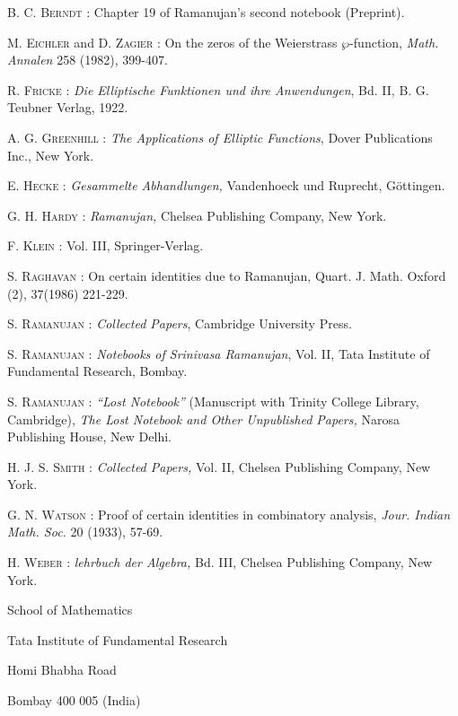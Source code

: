 \begin{thebibliography}{99}
 \textsc{B. C. Berndt :} Chapter 19 of Ramanujan's second notebook (Preprint).

 \textsc{M. Eichler} and \textsc{D. Zagier :} On the zeros of the Weierstrass $\wp$-function, {\em Math. Annalen} 258 (1982), 399-407.

 \textsc{R. Fricke :} {\em Die Elliptische Funktionen und ihre Anwendungen}, Bd. II, B. G. Teubner Verlag, 1922.

 \textsc{A. G. Greenhill :} {\em The Applications of Elliptic Functions}, Dover Publications Inc., New York.

 \textsc{E. Hecke :} {\em Gesammelte Abhandlungen,} Vandenhoeck und Ruprecht, G\"ottingen.

 \textsc{G. H. Hardy :} {\em Ramanujan,} Chelsea Publishing Company, New York.

 \textsc{F. Klein :} Vol. III, Springer-Verlag.

 \textsc{S. Raghavan :} On certain identities due to Ramanujan, Quart. J. Math. Oxford (2), 37(1986) 221-229.

 \textsc{S. Ramanujan :} {\em Collected Papers}, Cambridge University Press.

 \textsc{S. Ramanujan :} {\em Notebooks of Srinivasa Ramanujan}, Vol. II, Tata Institute of Fundamental Research, Bombay.

 \textsc{S. Ramanujan :} {\em ``Lost Notebook''} (Manuscript with Trinity College Library, Cambridge), {\em The Lost Notebook and Other Unpublished Papers,} Narosa Publishing House, New Delhi.

 \textsc{H. J. S. Smith :} {\em Collected Papers,} Vol. II, Chelsea Publishing Company, New York.

 \textsc{G. N. Watson :} Proof of certain identities in combinatory analysis, {\em Jour. Indian Math. Soc.} 20 (1933), 57-69.

 \textsc{H. Weber :} {\em lehrbuch der Algebra,} Bd. III, Chelsea Publishing Company, New York.

\end{thebibliography}

\bigskip
\noindent
{\small School of Mathematics}

\noindent
{\small Tata Institute of Fundamental Research}

\noindent
{\small Homi Bhabha Road}

\noindent
{\small Bombay 400 005 (India)}
